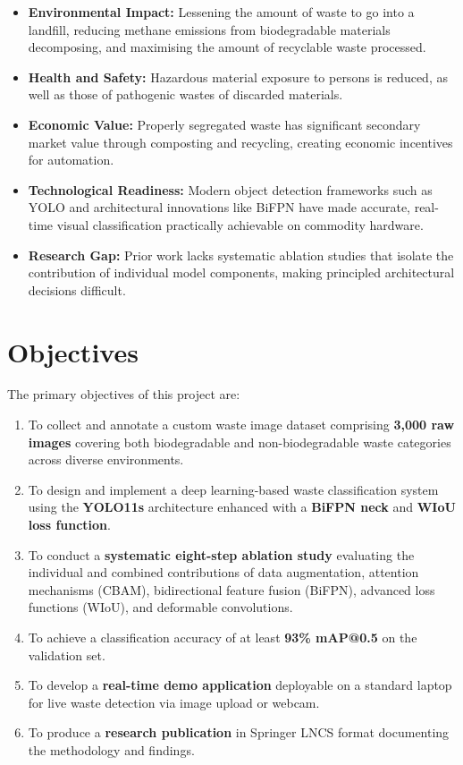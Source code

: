 \begin{itemize}
    \item \textbf{Environmental Impact:} Lessening the amount of waste to go into a landfill, reducing methane emissions from biodegradable materials decomposing, and maximising the amount of recyclable waste processed.
    \item \textbf{Health and Safety:} Hazardous material exposure to persons is reduced, as well as those of pathogenic wastes of discarded materials.
    \item \textbf{Economic Value:} Properly segregated waste has significant secondary market value through composting and recycling, creating economic incentives for automation.
    \item \textbf{Technological Readiness:} Modern object detection frameworks such as YOLO and architectural innovations like BiFPN have made accurate, real-time visual classification practically achievable on commodity hardware.
    \item \textbf{Research Gap:} Prior work lacks systematic ablation studies that isolate the contribution of individual model components, making principled architectural decisions difficult.
\end{itemize}

\section{Objectives}

The primary objectives of this project are:

\begin{enumerate}
    \item To collect and annotate a custom waste image dataset comprising \textbf{3,000 raw images} covering both biodegradable and non-biodegradable waste categories across diverse environments.
    \item To design and implement a deep learning-based waste classification system using the \textbf{YOLO11s} architecture enhanced with a \textbf{BiFPN neck} and \textbf{WIoU loss function}.
    \item To conduct a \textbf{systematic eight-step ablation study} evaluating the individual and combined contributions of data augmentation, attention mechanisms (CBAM), bidirectional feature fusion (BiFPN), advanced loss functions (WIoU), and deformable convolutions.
    \item To achieve a classification accuracy of at least \textbf{93\% mAP@0.5} on the validation set.
    \item To develop a \textbf{real-time demo application} deployable on a standard laptop for live waste detection via image upload or webcam.
    \item To produce a \textbf{research publication} in Springer LNCS format documenting the methodology and findings.
\end{enumerate}

